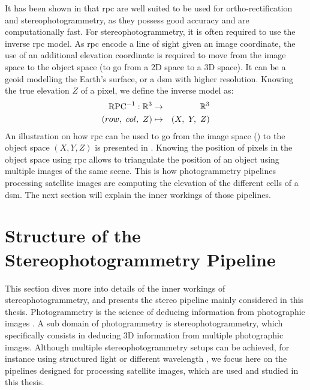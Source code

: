It has been shown in \cite{baltsavias_metric_1992} that \acrshort{rpc} are well suited to be used for ortho-rectification and stereophotogrammetry, as they possess good accuracy and are computationally fast. For stereophotogrammetry, it is often required to use the inverse \acrshort{rpc} model. As \acrshort{rpc} encode a line of sight given an image coordinate, the use of an additional elevation coordinate is required to move from the image space to the object space (\ie to go from a 2D space to a 3D space). It can be a geoid modelling the Earth's surface, or a \acrshort{dsm} with higher resolution. Knowing the true elevation $Z$ of a pixel, we define the inverse model as:
\begin{eqnarray}
    \mathrm{RPC}^{-1}:\mathbb{R}^3 &\rightarrow&\mathbb{R}^3\nonumber\\
    (row, ~col,~Z) 	&\mapsto& (X,~Y,~Z) \label{eq:inverse_rpc}
\end{eqnarray}
An illustration on how \acrshort{rpc} can be used to go from the image space (\rowcol) to the object space $(X,Y,Z)$ is presented in . Knowing the position of pixels in the object space using \acrshort{rpc} allows to triangulate the position of an object using multiple images of the same scene. This is how photogrammetry pipelines processing satellite images are computing the elevation of the different cells of a \acrshort{dsm}. The next section will explain the inner workings of those pipelines.

\section{Structure of the Stereophotogrammetry Pipeline}\label{sec:classical_stero_pipeline}
This section dives more into details of the inner workings of stereophotogrammetry, and presents the stereo pipeline mainly considered in this thesis. Photogrammetry is the science of deducing information from photographic images \cite{kasser_photogrammetrie_2001}. A sub domain of photogrammetry is stereophotogrammetry, which specifically consists in deducing 3D information from multiple photographic images. Although multiple stereophotogrammetry setups can be achieved, for instance using structured light \cite{scharstein_high-accuracy_2003} or different wavelength \cite{geng_rainbow_1996}, we focus here on the pipelines designed for processing satellite images, which are used and studied in this thesis. 


